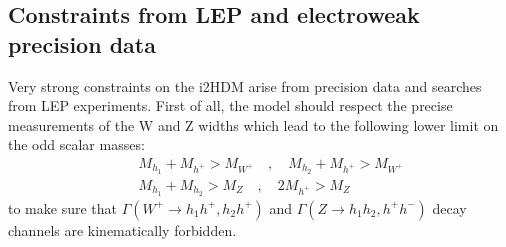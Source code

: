 \documentclass[12pt,a4paper]{article}
\begin{document}
%
\subsection{Constraints from LEP and electroweak precision data}

Very strong constraints on the i2HDM arise from precision data and searches from LEP experiments. First of all,
the model should respect the  precise measurements of the W and Z widths
which lead to the following lower limit on the odd scalar masses:
\begin{eqnarray}
\label{eq:constr-widths}
&& M_{h_1} + M_{h^{+}} > M_{W^{+}} \quad , \quad M_{h_2} + M_{h^{+}} > M_{W^{+}} \nonumber\\
&& M_{h_1} + M_{h_2} > M_{Z} \quad , \quad 2M_{h^{+}} > M_{Z}
\end{eqnarray}
to make sure that $\Gamma({W^{+} \rightarrow h_1 h^{+},h_2h^{+}})$ and $\Gamma({Z \rightarrow h_1h_2,h^+h^-})$ decay channels are kinematically 
forbidden.
\end{document}
